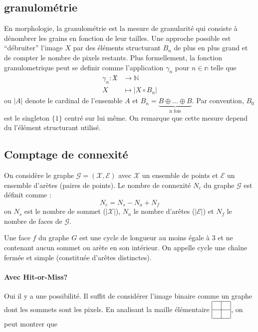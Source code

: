\documentclass[10pt,a4paper]{article}
\begin{document}
{\subsection{granulom\'{e}trie}
En morphologie, la granulom\'{e}trie est la mesure de granularit\'{e} qui consiste \`{a} d\'{e}nombrer les grains en fonction de leur tailles. Une approche possible est ``d\'{e}bruiter'' l'image $X$ par des \'{e}l\'{e}ments structurant $B_n$ de plus en plus grand et de compter le nombre de pixels restants. Plus formellement, la fonction granulometrique peut se definir comme l'application $\gamma_n$ pour $n\in\mathbb{n}$ telle que
\begin{align*}
	\gamma_n : \mathfrak{X} &\longrightarrow \mathbb{N}\\
						X     & \longmapsto \left| X \circ B_n \right|
\end{align*}
ou $\left|  A \right|$ denote le cardinal de l'ensemble $A$ et $B_n = \underset{\text{n fois}}{\underbrace{B \oplus\ldots\oplus B}}$. Par convention, $B_0$ est le singleton $\{1\}$ centr\'{e} sur lui m\^{e}me.
On remarque que cette mesure depend du l'\'{e}l\'{e}ment structurant utilis\'{e}.

\subsection{Comptage de connexit\'{e}}
On consid\`{e}re le graphe $\mathcal{G}=\left(\mathcal{X},\mathcal{E}\right)$ avec $\mathcal{X}$ un ensemble de points et $\mathcal{E}$ un ensemble d'ar\`{e}tes (paires de points).
Le nombre de connexit\'{e} $N_c$ du graphe $\mathcal{G}$  est d\'{e}finit comme :
\begin{displaymath}
	N_c = N_s - N_a + N_f
\end{displaymath}
ou $N_s$ est le nombre de sommet ($\left|\mathcal{X}\right|$), $N_a$ le nombre d'ar\^{e}tes ($\left|\mathcal{E}\right|$) et $N_f$ le nombre de faces de $\mathcal{G}$. 

Une face $f$ du graphe $G$ est une cycle de longueur au moins \'{e}gale \`{a} 3 et ne contenant aucun sommet ou ar\`{e}te en son int\'{e}rieur. On appelle cycle une cha\^{i}ne ferm\'{e}e et simple (constitu\'{e}e d'ar\^{e}tes distinctes).

\paragraph{Avec Hit-or-Miss?} Oui il y a une possibilit\'{e}. Il suffit de consid\'{e}rer l'image binaire comme un graphe dont les sommets sont les pixels. En analisant la maille \'{e}l\'{e}mentaire $\begin{array}{|c|c|}  \hline ~  & ~   \\  \hline ~  & ~   \\ \hline \end{array}$, on peut montrer que 

}
\end{document}
